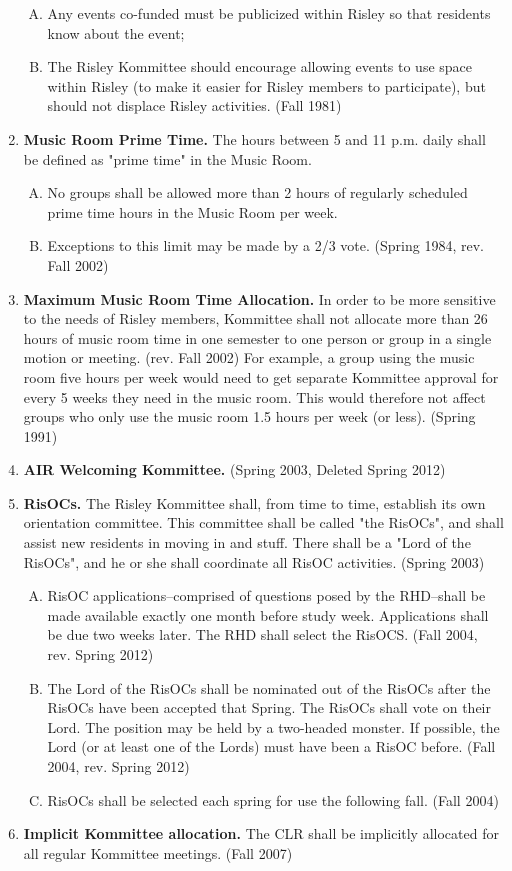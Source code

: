 \documentclass[12pt]{article}
\begin{document}
\begin{enumerate}[1.]
\begin{enumerate}[A.]
\item Any events co-funded must be publicized within Risley so that residents know about the event; 
\item The Risley Kommittee should encourage allowing events to use space within Risley (to make it easier for Risley members to participate), but should not displace Risley activities. (Fall 1981)
\end{enumerate}
\item \textbf{Music Room Prime Time.} The hours between 5 and 11 p.m. daily shall be defined as "prime time" in the Music Room.
\begin{enumerate}[A.]
\item No groups shall be allowed more than 2 hours of regularly scheduled prime time hours in the Music Room per week. 
\item Exceptions to this limit may be made by a 2/3 vote. (Spring 1984, rev. Fall 2002)
\end{enumerate}
\item \textbf{Maximum Music Room Time Allocation.} In order to be more sensitive to the needs of Risley members, Kommittee shall not allocate more than 26 hours of music room time in one semester to one person or group in a single motion or meeting. (rev. Fall 2002) For example, a group using the music room five hours per week would need to get separate Kommittee approval for every 5 weeks they need in the music room. This would therefore not affect groups who only use the music room 1.5 hours per week (or less). (Spring 1991)
\item \textbf{AIR Welcoming Kommittee.} (Spring 2003, Deleted Spring 2012)
\item \textbf{RisOCs.} The Risley Kommittee shall, from time to time, establish its own orientation committee. This committee shall be called "the RisOCs", and shall assist new residents in moving in and stuff. There shall be a "Lord of the RisOCs", and he or she shall coordinate all RisOC activities. (Spring 2003)
\begin{enumerate}[A.]
\item RisOC applications--comprised of questions posed by the RHD--shall be made available exactly one month before study week. Applications shall be due two weeks later. The RHD shall select the RisOCS. (Fall 2004, rev. Spring 2012) 
\item The Lord of the RisOCs shall be nominated out of the RisOCs after the RisOCs have been accepted that Spring. The RisOCs shall vote on their Lord. The position may be held by a two-headed monster. If possible, the Lord (or at least one of the Lords) must have been a RisOC before. (Fall 2004, rev. Spring 2012) 
\item RisOCs shall be selected each spring for use the following fall. (Fall 2004)
\end{enumerate}
\item \textbf{Implicit Kommittee allocation.} The CLR shall be implicitly allocated for all regular Kommittee meetings. (Fall 2007) 
\end{enumerate}
\end{document}
